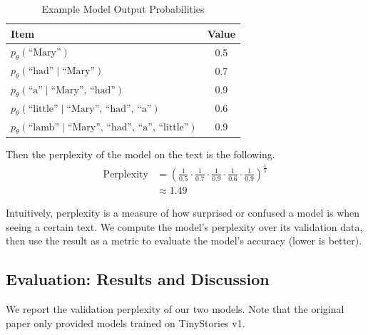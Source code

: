 \documentclass[../main.tex]{subfiles}
\begin{document}
\begin{table}[H]
\centering
\caption{Example Model Output Probabilities}
\begin{tabular}{|l|c|}
    \hline
    Item & Value \\ \hline
    $p_\theta(\text{``Mary''})$ & 0.5 \\ \hline
    $p_\theta(\text{``had''}\mid\text{``Mary''})$ & 0.7 \\ \hline
    $p_\theta(\text{``a''}\mid\text{``Mary'', ``had''})$ & 0.9 \\ \hline
    $p_\theta(\text{``little''}\mid\text{``Mary'', ``had'', ``a''})$ & 0.6 \\ \hline
    $p_\theta(\text{``lamb''}\mid\text{``Mary'', ``had'', ``a'', ``little''})$ & 0.9 \\ \hline
\end{tabular}
\end{table}

Then the perplexity of the model on the text is the following.
\begin{align}
    \text{Perplexity} &= \left(\frac{1}{0.5}\cdot\frac{1}{0.7}\cdot\frac{1}{0.9}\cdot\frac{1}{0.6}\cdot\frac{1}{0.9}\right)^{\frac15} \\
    &\approx 1.49
\end{align}

Intuitively, perplexity is a measure of how surprised or confused a model is when seeing a certain text. We compute the model's perplexity over its validation data, then use the result as a metric to evaluate the model's accuracy (lower is better).

\subsection{Evaluation: Results and Discussion}
We report the validation perplexity of our two models. Note that the original paper only provided models trained on TinyStories v1.
\end{document}
